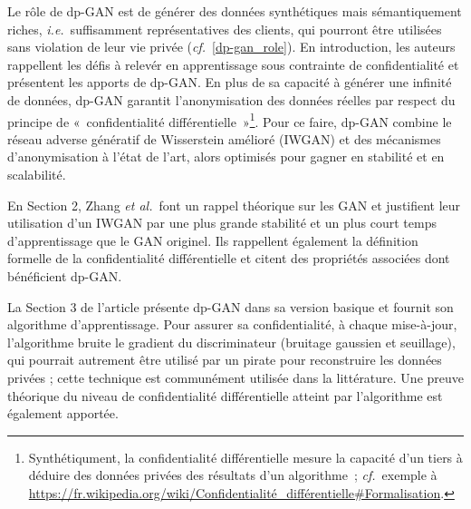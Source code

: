 \documentclass[a4paper,11pt]{article}
\theoremstyle{definition}
\newcommand{\ie}{\textit{i.e.}}
\newcommand{\etal}{\textit{et al.}}
\newcommand{\cf}{\textit{cf.}}
\begin{document}
Le rôle de dp-GAN est de générer des données synthétiques mais sémantiquement riches, \ie\ suffisamment représentatives des clients, qui pourront être utilisées sans violation de leur vie privée (\cf\ \autoref{dp-gan_role}).
En introduction, les auteurs rappellent les défis à relevér en apprentissage sous contrainte de confidentialité et présentent les apports de dp-GAN. En plus de sa capacité à générer une infinité de données, dp-GAN garantit l'anonymisation des données réelles par respect du principe de « confidentialité différentielle »\footnote{Synthétiqument, la confidentialité différentielle mesure la capacité d'un tiers à déduire des données privées des résultats d'un algorithme ; \cf\ exemple à \url{https://fr.wikipedia.org/wiki/Confidentialité_différentielle#Formalisation}.}.
Pour ce faire, dp-GAN combine le réseau adverse génératif de Wisserstein amélioré (IWGAN) et des mécanismes d'anonymisation à l'état de l'art, alors optimisés pour gagner en stabilité et en scalabilité.


En Section 2, Zhang \etal\ font un rappel théorique sur les GAN et justifient leur utilisation d'un IWGAN par une plus grande stabilité et un plus court temps d'apprentissage que le GAN originel. Ils rappellent également la définition formelle de la confidentialité différentielle et citent des propriétés associées dont bénéficient dp-GAN.

La Section 3 de l'article présente dp-GAN dans sa version basique et fournit son algorithme d'apprentissage. Pour assurer sa confidentialité, à chaque mise-à-jour, l'algorithme bruite le gradient du discriminateur (bruitage gaussien et seuillage), qui pourrait autrement être utilisé par un pirate pour reconstruire les données privées ; cette technique est communément utilisée dans la littérature. Une preuve théorique du niveau de confidentialité différentielle atteint par l'algorithme est également apportée.
\end{document}
